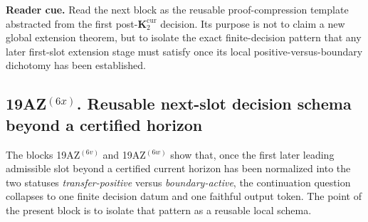 \noindent\textbf{Reader cue.} Read the next block as the reusable proof-compression template abstracted from the first post-$\mathbf K_2^{\mathrm{cur}}$ decision. Its purpose is not to claim a new global extension theorem, but to isolate the exact finite-decision pattern that any later first-slot extension stage must satisfy once its local positive-versus-boundary dichotomy has been established.

\subsection*{19AZ$^{(6x)}$. Reusable next-slot decision schema beyond a certified horizon}
\label{sec:reusable-next-slot-decision-schema-beyond-certified-horizon}
The blocks 19AZ$^{(6v)}$ and 19AZ$^{(6w)}$ show that, once the first later leading admissible slot beyond a certified current horizon has been normalized into the two statuses \emph{transfer-positive} versus \emph{boundary-active}, the continuation question collapses to one finite decision datum and one faithful output token. The point of the present block is to isolate that pattern as a reusable local schema.

